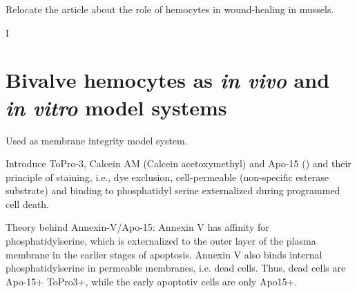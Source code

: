Relocate the article about the role of hemocytes in wound-healing in mussels.

I

\section{Bivalve hemocytes as \emph{in vivo} and \emph{in vitro} model systems}
Used as membrane integrity model system.

Introduce ToPro-3, Calcein AM (Calcein acetoxymethyl) and Apo-15 (\cite{Barth2020}) and their principle of staining, i.e., dye exclusion, cell-permeable (non-specific esterase substrate) and binding to phosphatidyl serine externalized during programmed cell death.

Theory behind Annexin-V/Apo-15: Annexin V
has affinity for phosphatidylserine, which is externalized to the
outer layer of the plasma membrane in the earlier stages of apoptosis. Annexin V also binds internal phosphatidylserine in permeable membranes, i.e. dead cells. Thus, dead cells are Apo-15+ ToPro3+, while the early apoptotiv cells are only Apo15+.



